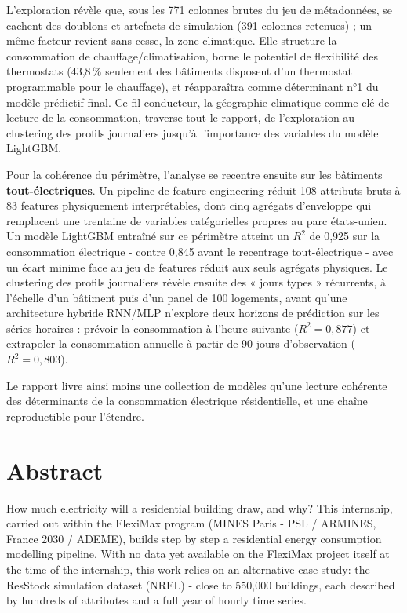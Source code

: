 L'exploration révèle que, sous les 771 colonnes brutes du jeu de métadonnées, se cachent des
doublons et artefacts de simulation (391 colonnes retenues) ; un même facteur revient sans cesse,
la zone climatique. Elle structure la consommation de chauffage/climatisation, borne le
potentiel de flexibilité des thermostats (43,8\,\% seulement des bâtiments disposent d'un
thermostat programmable pour le chauffage), et réapparaîtra comme déterminant n°1 du modèle
prédictif final. Ce fil conducteur, la géographie climatique comme clé de lecture de la
consommation, traverse tout le rapport, de l'exploration au clustering des profils
journaliers jusqu'à l'importance des variables du modèle LightGBM.

Pour la cohérence du périmètre, l'analyse se recentre ensuite sur les bâtiments
\textbf{tout-électriques}. Un pipeline de feature engineering réduit 108 attributs bruts à 83
features physiquement interprétables, dont cinq agrégats d'enveloppe qui remplacent une trentaine
de variables catégorielles propres au parc états-unien. Un modèle LightGBM entraîné sur ce
périmètre atteint un $R^2$ de 0,925 sur la consommation électrique - contre 0,845 avant le
recentrage tout-électrique - avec un écart minime face au jeu de features réduit aux seuls
agrégats physiques. Le clustering des profils journaliers révèle ensuite des « jours types »
récurrents, à l'échelle d'un bâtiment puis d'un panel de 100 logements, avant qu'une architecture
hybride RNN/MLP n'explore deux horizons de prédiction sur les séries horaires : prévoir la
consommation à l'heure suivante ($R^2=0{,}877$) et extrapoler la consommation annuelle à partir de
90 jours d'observation ($R^2=0{,}803$).

Le rapport livre ainsi moins une collection de modèles qu'une lecture cohérente des déterminants
de la consommation électrique résidentielle, et une chaîne reproductible pour l'étendre.

\section*{Abstract}

How much electricity will a residential building draw, and why? This internship, carried out within the
FlexiMax program (MINES Paris - PSL / ARMINES, France 2030 / ADEME), builds step by step a
residential energy consumption modelling pipeline. With no data yet available on the FlexiMax
project itself at the time of the internship, this work relies on an alternative case study:
the ResStock simulation dataset (NREL) - close to 550,000 buildings, each described by hundreds
of attributes and a full year of hourly time series.

